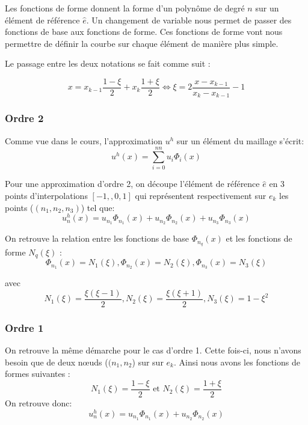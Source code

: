 \documentclass[a4paper,10pt]{report} %
\begin{document}
Les fonctions de forme donnent la forme d'un polynôme de degré $n$ sur un élément de référence $\hat{e}$. Un changement de variable nous permet de passer des fonctions de base aux fonctions de forme. Ces fonctions de forme vont nous permettre de définir la courbe sur chaque élément de manière plus simple.

Le passage entre les deux notations se fait comme suit :

\begin{displaymath}
		x=x_{k-1}\frac{1-\xi}{2}+x_{k}\frac{1+\xi}{2} \Leftrightarrow \xi=2\frac{x-x_{k-1}}{x_{k}-x_{k-1}}-1
\end{displaymath}

\subsubsection{Ordre 2}

Comme vue dans le cours, l'approximation $u^{h}$ sur un élément du maillage s'écrit:
\begin{displaymath}
u^{h}(x)=\sum_{i=0}^{nn}u_{i}\Phi_{i}(x)\end{displaymath}

Pour une approximation d'ordre 2, on découpe l'élément de référence $\hat{e}$ en 3 points d'interpolations $[-1,,0,1]$ qui représentent respectivement sur $e_{k}$ les points ($(n_{1},n_{2},n_{3})$) tel que:
\begin{displaymath}
u^{h}_n(x)=u_{n_{1}}\Phi_{n_{1}}(x)+u_{n_{2}}\Phi_{n_{2}}(x)+u_{n_{3}}\Phi_{n_{3}}(x)\end{displaymath}

On retrouve la relation entre les fonctions de base  $\Phi_{n_{q}}(x)$ et les fonctions de forme $N_{q}(\xi)$ :
\begin{displaymath}
\Phi_{n_{1}}(x)=N_{1}(\xi), \Phi_{n_{2}}(x)=N_{2}(\xi), \Phi_{n_{3}}(x)=N_{3}(\xi)\end{displaymath}

avec 
\begin{displaymath}
N_{1}(\xi)=\frac{\xi(\xi-1)}{2},  N_{2}(\xi)=\frac{\xi(\xi+1)}{2},  N_{3}(\xi)=1-\xi^{2}\end{displaymath}

\subsubsection{Ordre 1}

On retrouve la même démarche pour le cas d'ordre 1. Cette fois-ci, nous n'avons besoin que de deux nœuds ($(n_{1},n_{2}$) sur sur $e_{k}$.
Ainsi nous avons les fonctions de formes suivantes :
\begin{displaymath}
N_{1}(\xi)=\frac{1-\xi}{2} \mbox{  et  }  N_{2}(\xi)=\frac{1+\xi}{2}
\end{displaymath}
On retrouve donc:
\begin{displaymath}
u^{h}_n(x)=u_{n_{1}}\Phi_{n_{1}}(x)+u_{n_{2}}\Phi_{n_{2}}(x)\end{displaymath}
\end{document}
